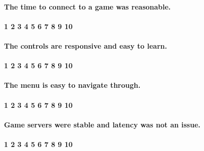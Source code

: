 \documentclass[12pt, titlepage]{article}
\begin{document}
\paragraph{The time to connect to a game was reasonable.}
\paragraph{1 2 3 4 5 6 7 8 9 10}
\paragraph{The controls are responsive and easy to learn.}
\paragraph{1 2 3 4 5 6 7 8 9 10}
\paragraph{The menu is easy to navigate through.}
\paragraph{1 2 3 4 5 6 7 8 9 10}
\paragraph{Game servers were stable and latency was not an issue.}
\paragraph{1 2 3 4 5 6 7 8 9 10}
\end{document}
